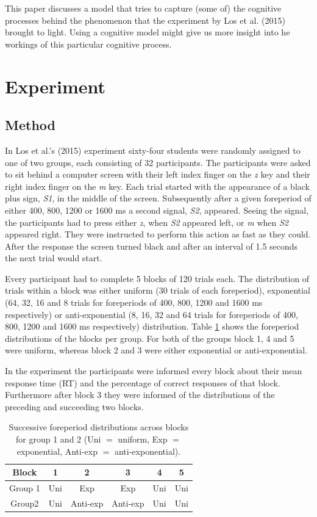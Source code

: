 \documentclass[10pt,letterpaper]{article}
\begin{document}
This paper discusses a model that tries to capture (some of) the cognitive processes behind the phenomenon that the experiment by Los et al. (2015) brought to light. Using a cognitive model might give us more insight into he workings of this particular cognitive process.

\section{Experiment}
\subsection{Method}
In Los et al.'s (2015) experiment sixty-four students were randomly assigned to one of two groups, each consisting of 32 participants. The participants were asked to sit behind a computer screen with their left index finger on the \textit{z} key and their right index finger on the \textit{m} key. Each trial started with the appearance of a black plus sign, \textit{S1}, in the middle of the screen. Subsequently after a given foreperiod of either 400, 800, 1200 or 1600 ms a second signal, \textit{S2}, appeared. Seeing the signal, the participants had to press either \textit{z}, when \textit{S2} appeared left, or \textit{m} when \textit{S2} appeared right. They were instructed to perform this action as fast as they could. After the response the screen turned black and after an interval of 1.5 seconds the next trial would start.

Every participant had to complete 5 blocks of 120 trials each. The distribution of trials within a block was either uniform (30 trials of each foreperiod), exponential (64, 32, 16 and 8 trials for foreperiods of 400, 800, 1200 and 1600 ms respectively) or anti-exponential (8, 16, 32 and 64 trials for foreperiods of 400, 800, 1200 and 1600 ms respectively) distribution. Table \ref{Table1} shows the foreperiod distributions of the blocks per group. For both of the groups block 1, 4 and 5 were uniform, whereas block 2 and 3 were either exponential or anti-exponential.

In the experiment the participants were informed every block about their mean response time (RT) and the percentage of correct responses of that block. Furthermore after block 3 they were informed of the distributions of the preceding and succeeding two blocks.

\begin{table}
	\centering
	\caption{Successive foreperiod distributions across blocks for group 1 and 2 (Uni $=$ uniform, Exp $=$ exponential, Anti-exp $=$ anti-exponential).}
	\begin{tabular}{c|c|c|c|c|c}
		Block & 1 & 2 & 3 & 4 & 5 \\
		\hline
		Group 1 & Uni & Exp & Exp & Uni & Uni \\
		Group2 & Uni & Anti-exp & Anti-exp & Uni & Uni
	\end{tabular}
	\label{Table1}
\end{table}
\end{document}

